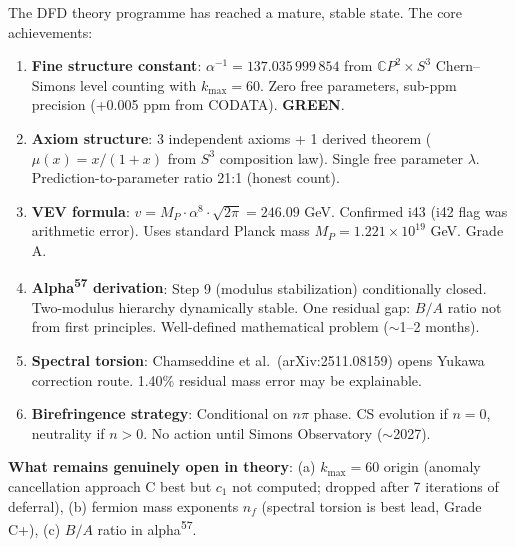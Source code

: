 \documentclass[11pt,a4paper]{article}
\newcommand{\GREEN}{\textcolor{dfdgreen}{\textbf{GREEN}}}
\newcommand{\CP}{\mathbb{C}P}
\begin{document}
\begin{tcolorbox}[colback=blue!5!white, colframe=blue!60!black,
  title={Theory Sector: Final Status Entering Penultimate Iteration}]

The DFD theory programme has reached a mature, stable state. The core achievements:

\begin{enumerate}
\item \textbf{Fine structure constant}: $\alpha^{-1} = 137.035\,999\,854$ from $\CP^2 \times S^3$ Chern--Simons level counting with $k_{\max} = 60$. Zero free parameters, sub-ppm precision (+0.005 ppm from CODATA). \GREEN.

\item \textbf{Axiom structure}: 3 independent axioms + 1 derived theorem ($\mu(x) = x/(1+x)$ from $S^3$ composition law). Single free parameter $\lambda$. Prediction-to-parameter ratio 21:1 (honest count).

\item \textbf{VEV formula}: $v = M_P \cdot \alpha^8 \cdot \sqrt{2\pi} = 246.09$ GeV. Confirmed i43 (i42 flag was arithmetic error). Uses standard Planck mass $M_P = 1.221 \times 10^{19}$ GeV. Grade A.

\item \textbf{Alpha\textsuperscript{57} derivation}: Step 9 (modulus stabilization) conditionally closed. Two-modulus hierarchy dynamically stable. One residual gap: $B/A$ ratio not from first principles. Well-defined mathematical problem ($\sim$1--2 months).

\item \textbf{Spectral torsion}: Chamseddine et al.\ (arXiv:2511.08159) opens Yukawa correction route. 1.40\% residual mass error may be explainable.

\item \textbf{Birefringence strategy}: Conditional on $n\pi$ phase. CS evolution if $n = 0$, neutrality if $n > 0$. No action until Simons Observatory ($\sim$2027).
\end{enumerate}

\textbf{What remains genuinely open in theory}: (a) $k_{\max} = 60$ origin (anomaly cancellation approach C best but $c_1$ not computed; dropped after 7 iterations of deferral), (b) fermion mass exponents $n_f$ (spectral torsion is best lead, Grade C+), (c) $B/A$ ratio in alpha\textsuperscript{57}.
\end{tcolorbox}


\end{document}
